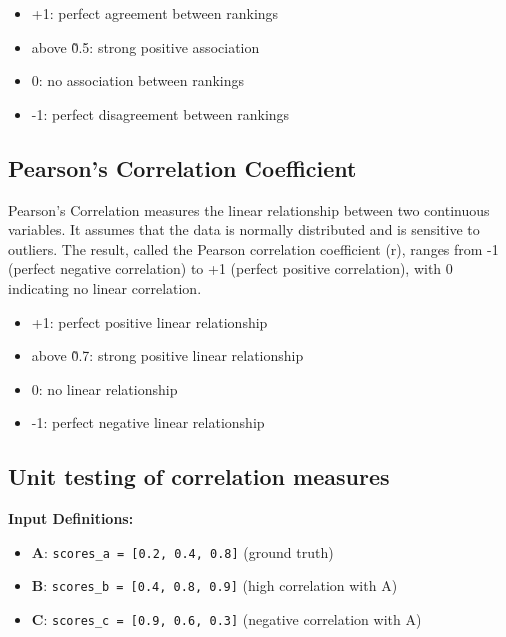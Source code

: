\begin{itemize}
    \item +1: perfect agreement between rankings
    \item above \~ 0.5: strong positive association
    \item 0: no association between rankings
    \item -1: perfect disagreement between rankings
\end{itemize}

\subsection{Pearson's Correlation Coefficient}\label{pearsons-correlation-coefficient}

Pearson's Correlation measures the linear relationship between two continuous variables. It assumes that the data is normally distributed and is sensitive to outliers. The result, called the Pearson correlation coefficient (r), ranges from -1 (perfect negative correlation) to +1 (perfect positive correlation), with 0 indicating no linear correlation.

\begin{itemize}
    \item +1: perfect positive linear relationship
    \item above \~ 0.7: strong positive linear relationship
    \item 0: no linear relationship
    \item -1: perfect negative linear relationship
\end{itemize}

\subsection{Unit testing of correlation measures}\label{unit-testing-of-correlation-measures}

\textbf{Input Definitions:}
\begin{itemize}
    \item \textbf{A}: \texttt{scores\_a = [0.2, 0.4, 0.8]} (ground truth)
    \item \textbf{B}: \texttt{scores\_b = [0.4, 0.8, 0.9]} (high correlation with A)
    \item \textbf{C}: \texttt{scores\_c = [0.9, 0.6, 0.3]} (negative correlation with A)
\end{itemize}


